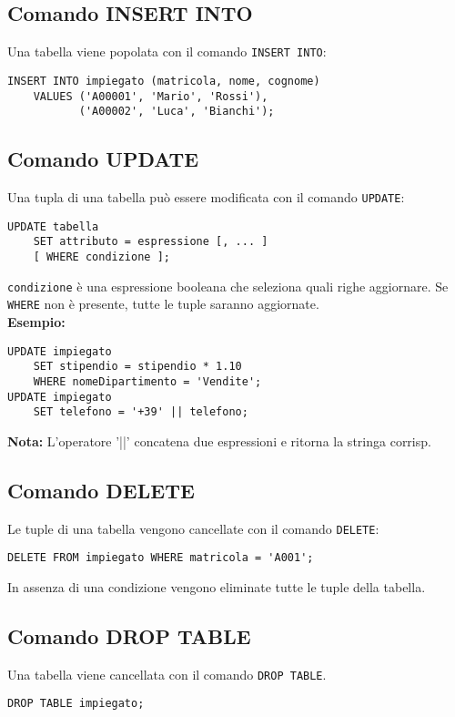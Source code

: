 \documentclass[a4paper, 10pt, titlepage]{article}
\begin{document}
	\subsection{Comando INSERT INTO}
		Una tabella viene popolata con il comando \lstinline|INSERT INTO|:
		\begin{lstlisting}
INSERT INTO impiegato (matricola, nome, cognome)
	VALUES ('A00001', 'Mario', 'Rossi'),
	       ('A00002', 'Luca', 'Bianchi');
		\end{lstlisting}
	
	\subsection{Comando UPDATE}
		Una tupla di una tabella può essere modificata con il comando \lstinline|UPDATE|:
		\begin{lstlisting}
UPDATE tabella
	SET attributo = espressione [, ... ]
	[ WHERE condizione ];
		\end{lstlisting}
	\lstinline|condizione| è una espressione booleana che seleziona quali righe
	aggiornare. Se \lstinline|WHERE| non è presente, tutte le tuple saranno aggiornate. \medskip \\
	\textbf{Esempio: }
	\begin{lstlisting}
UPDATE impiegato
	SET stipendio = stipendio * 1.10
	WHERE nomeDipartimento = 'Vendite';
UPDATE impiegato
	SET telefono = '+39' || telefono;
	\end{lstlisting}
	\textbf{Nota:} L’operatore '||' concatena due espressioni e ritorna la stringa corrisp.
	
	\subsection{Comando DELETE}
		Le tuple di una tabella vengono cancellate con il comando \lstinline|DELETE|:
		\begin{lstlisting}
DELETE FROM impiegato WHERE matricola = 'A001';
		\end{lstlisting}
		In assenza di una condizione vengono eliminate tutte le tuple della tabella.
	\subsection{Comando DROP TABLE}
		Una tabella viene cancellata con il comando \lstinline|DROP TABLE|.
		\begin{lstlisting}
DROP TABLE impiegato;
		\end{lstlisting}
		
\end{document}
